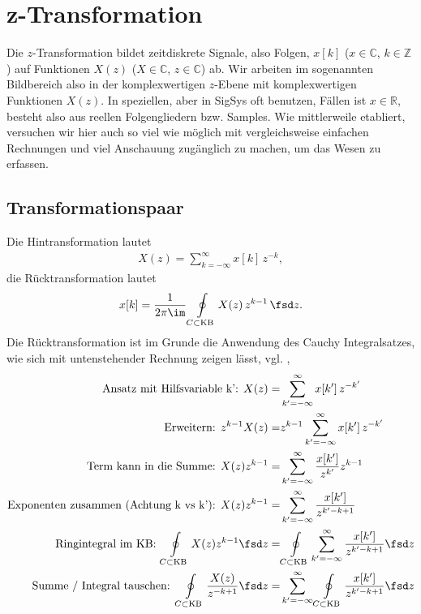 \clearpage
\section{z-Transformation}
%
Die $z$-Transformation bildet zeitdiskrete Signale, also Folgen, $x[k]$
($x\in\mathbb{C}$, $k\in\mathbb{Z}$)
auf Funktionen $X(z)$ ($X\in\mathbb{C}$, $z\in\mathbb{C}$)
ab.
%
Wir arbeiten im sogenannten Bildbereich also in der komplexwertigen $z$-Ebene mit
komplexwertigen Funktionen $X(z)$.
%
In speziellen, aber in SigSys oft benutzen, Fällen ist $x\in\mathbb{R}$, besteht
also aus reellen Folgengliedern bzw. Samples.
%
Wie mittlerweile etabliert, versuchen wir hier auch so viel wie möglich mit
vergleichsweise einfachen Rechnungen und viel Anschauung zugänglich zu machen,
um das Wesen zu erfassen.
%


\subsection*{Transformationspaar}
Die Hintransformation lautet
\begin{align}
X(z) = \sum_{k=-\infty}^{\infty} x[k] \, z^{-k},
\end{align}
die Rücktransformation lautet
\begin{align}
x[k] = \frac{1}{2\pi \im} \oint\limits_{C \subset \text{KB}} X(z) \, z^{k-1} \, \fsd z.
\end{align}
%
Die Rücktransformation ist im Grunde die Anwendung des Cauchy
Integralsatzes, wie sich mit untenstehender Rechnung zeigen lässt, vgl.
\cite[S.\,152]{Wunsch1972}, \cite[S.\,180ff]{Wunsch2006a}
\begin{align}
\text{Ansatz mit Hilfsvariable k':   } X(z) =& \sum_{k'=-\infty}^{\infty} x[k'] \, z^{-k'}\\
\text{Erweitern:   } z^{k-1} X(z) =& z^{k-1} \sum_{k'=-\infty}^{\infty} x[k'] \, z^{-k'}\\
\text{Term kann in die Summe:   } X(z) z^{k-1} =& \sum_{k'=-\infty}^{\infty} \frac{x[k']}{z^{k'}} z^{k-1}\\
\text{Exponenten zusammen (Achtung k vs k'):    } X(z) z^{k-1} =& \sum_{k'=-\infty}^{\infty} \frac{x[k']}{z^{k'-k+1}}\\
\text{Ringintegral im KB:   } \oint\limits_{C \subset \text{KB}} X(z) z^{k-1} \fsd z =&
\oint\limits_{C \subset \text{KB}}
\sum_{k'=-\infty}^{\infty} \frac{x[k']}{z^{k'-k+1}} \fsd z\\
\text{Summe / Integral tauschen:   }
\oint\limits_{C \subset \text{KB}} \frac{X(z)}{z^{-k+1}} \fsd z =&
\sum_{k'=-\infty}^{\infty}
\oint\limits_{C \subset \text{KB}}
\frac{x[k']}{z^{k'-k+1}} \fsd z
\end{align}
